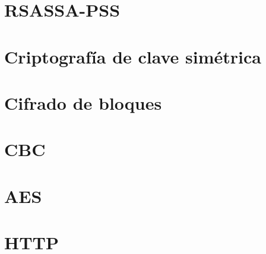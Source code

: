  \section{RSASSA-PSS}


 \section{Criptografía de clave simétrica}


 \section{Cifrado de bloques}


 \section{CBC}


 \section{AES}


 \section{HTTP}
